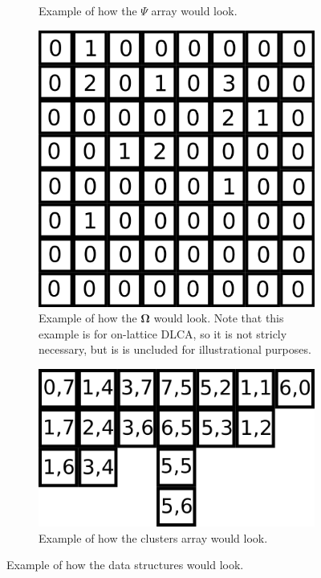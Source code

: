 \begin{figure}[h]
\begin{center}
\begin{subfigure}[t]{0.23\textwidth}
			\caption{Example of how the $\Psi$ array would look.}
			\label{fig:num_grid_example}
		\end{subfigure}
		\begin{subfigure}[t]{0.23\textwidth}
		\includegraphics[width = \textwidth]{fig/num_grid_N_example.png}
			\caption{Example of how the $\mathbf{\Omega}$ would look. Note that this example is for on-lattice DLCA, so it is not stricly necessary, but is is uncluded for illustrational purposes.}
			\label{fig:num_grid_N_example}
		\end{subfigure}
		\begin{subfigure}[t]{0.23\textwidth}
			\includegraphics[width = \textwidth]{fig/clusters_example_schematic}
			\caption{Example of how the clusters array would look. }
			\label{fig:clusters_example_schematic}
		\end{subfigure}
		\caption{Example of how the data structures would look.}
		\label{fig:arrays}
	\end{center}
\end{figure}

